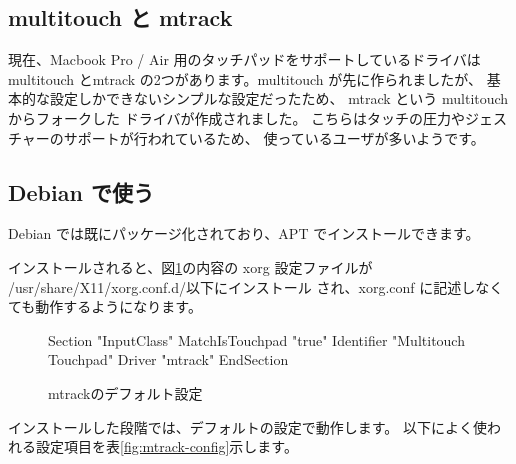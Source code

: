\documentclass[mingoth,a4paper]{jsarticle}
\begin{document}
\subsection{multitouch と mtrack}

現在、Macbook Pro / Air 用のタッチパッドをサポートしているドライバは
multitouch とmtrack の2つがあります。multitouch が先に作られましたが、
基本的な設定しかできないシンプルな設定だったため、
mtrack という multitouch からフォークした 
ドライバが作成されました。
こちらはタッチの圧力やジェスチャーのサポートが行われているため、
使っているユーザが多いようです。

\subsection{Debian で使う}
Debian では既にパッケージ化されており、APT でインストールできます。


インストールされると、図\ref{fig:mtrack-default}の内容の
xorg 設定ファイルが /usr/share/X11/xorg.conf.d/以下にインストール
され、xorg.conf に記述しなくても動作するようになります。

\begin{figure}[h]
\begin{commandline}
Section "InputClass"
    MatchIsTouchpad "true"
    Identifier "Multitouch Touchpad"
    Driver "mtrack"
EndSection
\end{commandline} 
\caption{mtrackのデフォルト設定}
\label{fig:mtrack-default}
\end{figure}

インストールした段階では、デフォルトの設定で動作します。
以下によく使われる設定項目を表\ref{fig:mtrack-config}示します。
\end{document}

